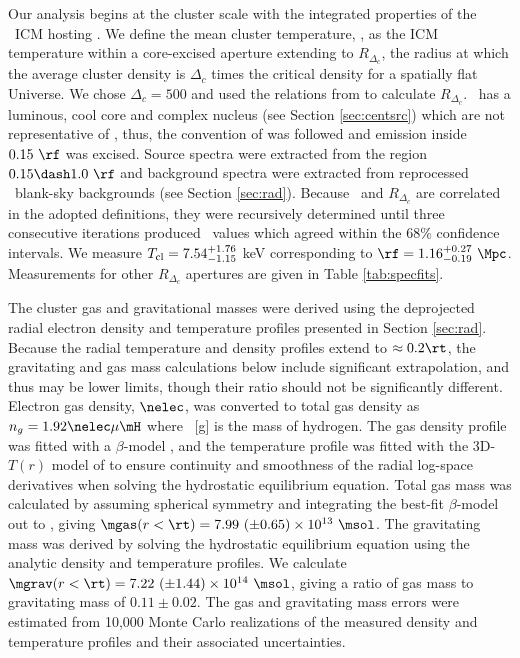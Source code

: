\documentclass[useAMS,usenatbib]{mn2e}
\begin{document}
Our analysis begins at the cluster scale with the integrated
properties of the \rxj\ ICM hosting \irs. We define the mean cluster
temperature, \cltx, as the ICM temperature within a core-excised
aperture extending to $R_{\Delta_c}$, the radius at which the average
cluster density is $\Delta_c$ times the critical density for a
spatially flat Universe. We chose $\Delta_c = 500$ and used the
relations from \cite{2002A&A...389....1A} to calculate
$R_{\Delta_c}$. \rxj\ has a luminous, cool core and complex nucleus
(see Section \ref{sec:centsrc}) which are not representative of \cltx,
thus, the convention of \citet{2007ApJ...668..772M} was followed and
emission inside $0.15 ~\rf$ was excised. Source spectra were extracted
from the region $0.15 \dash 1.0~\rf$ and background spectra were
extracted from reprocessed \caldb\ blank-sky backgrounds (see Section
\ref{sec:rad}). Because \cltx\ and $R_{\Delta_c}$ are correlated in
the adopted definitions, they were recursively determined until three
consecutive iterations produced \cltx\ values which agreed within the
68\% confidence intervals. We measure $T_{\mathrm{cl}} = 7.54^{+1.76}_{-1.15}$
keV corresponding to $\rf = 1.16^{+0.27}_{-0.19}~\Mpc$. Measurements
for other $R_{\Delta_c}$ apertures are given in Table
\ref{tab:specfits}.

The cluster gas and gravitational masses were derived using the
deprojected radial electron density and temperature profiles presented
in Section \ref{sec:rad}. Because the radial temperature and density
profiles extend to $\approx 0.2 \rt$, the gravitating and gas mass
calculations below include significant extrapolation, and thus may be
lower limits, though their ratio should not be significantly
different. Electron gas density, $\nelec$, was converted to total gas
density as $n_g = 1.92 \nelec \mu \mH$ where \mH\ [g] is the mass of
hydrogen. The gas density profile was fitted with a $\beta$-model
\citep{betamodel}, and the temperature profile was fitted with the
3D-$T(r)$ model of \citet{2006ApJ...640..691V} to ensure continuity
and smoothness of the radial log-space derivatives when solving the
hydrostatic equilibrium equation. Total gas mass was calculated by
assuming spherical symmetry and integrating the best-fit $\beta$-model
out to \rt, giving $\mgas(r<\rt) = 7.99 ~(\pm 0.65) \times 10^{13}
~\msol$. The gravitating mass was derived by solving the hydrostatic
equilibrium equation using the analytic density and temperature
profiles. We calculate $\mgrav(r<\rt) = 7.22 ~(\pm 1.44) \times
10^{14} ~\msol$, giving a ratio of gas mass to gravitating mass of
$0.11 \pm 0.02$. The gas and gravitating mass errors were estimated
from 10,000 Monte Carlo realizations of the measured density and
temperature profiles and their associated uncertainties.
\end{document}
